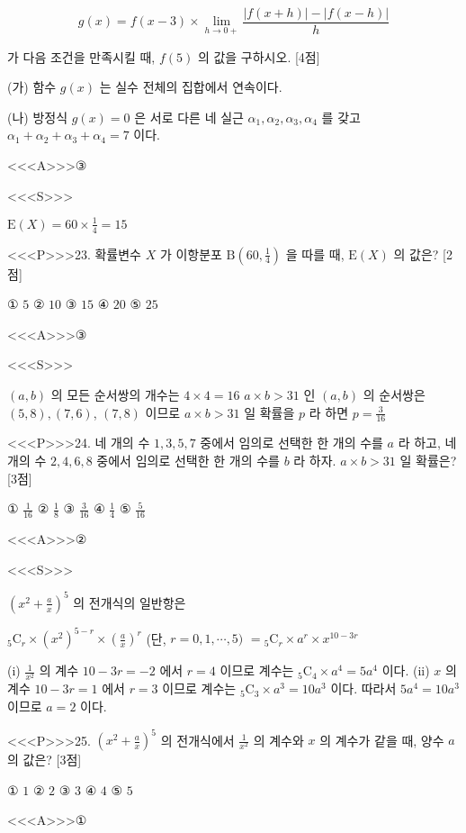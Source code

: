 \documentclass{oblivoir}
\begin{document}
$$g(x)=f(x-3) \times \lim _{h \rightarrow 0+} \frac{|f(x+h)|-|f(x-h)|}{h}$$

가 다음 조건을 만족시킬 때, $f(5)$ 의 값을 구하시오. [4점]

(가) 함수 $g(x)$ 는 실수 전체의 집합에서 연속이다.

(나) 방정식 $g(x)=0$ 은 서로 다른 네 실근 $\alpha_{1}, \alpha_{2}, \alpha_{3}, \alpha_{4}$ 를 갖고 $\alpha_{1}+\alpha_{2}+\alpha_{3}+\alpha_{4}=7$ 이다.

<<<A>>>③

<<<S>>>

$\mathrm{E}(X)=60 \times \frac{1}{4}=15$


<<<P>>>23. 확률변수 $X$ 가 이항분포 $\mathrm{B}\left(60, \frac{1}{4}\right)$ 을 따를 때, $\mathrm{E}(X)$ 의 값은? [2점]

① $5$
② $10$
③ $15$
④ $20$
⑤ $25$

<<<A>>>③

<<<S>>>


$(a, b)$ 의 모든 순서쌍의 개수는 $4 \times 4=16$
$a \times b>31$ 인 $(a, b)$ 의 순서쌍은 $(5,8),(7,6)$,
$(7,8)$ 이므로
$a \times b>31$ 일 확률을 $p$ 라 하면
$p=\frac{3}{16}$


<<<P>>>24. 네 개의 수 $1,3,5,7$ 중에서 임의로 선택한 한 개의 수를 $a$ 라 하고, 네 개의 수 $2,4,6,8$ 중에서 임의로 선택한 한 개의 수를 $b$ 라 하자. $a \times b>31$ 일 확률은? [3점]

① $\frac{1}{16}$
② $\frac{1}{8}$
③ $\frac{3}{16}$
④ $\frac{1}{4}$
⑤ $\frac{5}{16}$

<<<A>>>②

<<<S>>>



$\left(x^{2}+\frac{a}{x}\right)^{5}$ 의 전개식의 일반항은


${ }_{5} \mathrm{C}_{r} \times\left(x^{2}\right)^{5-r} \times\left(\frac{a}{x}\right)^{r}$ (단, $r=0,1, \cdots, 5)$
$={ }_{5} \mathrm{C}_{r} \times a^{r} \times x^{10-3 r}$


(i) $\frac{1}{x^{2}}$ 의 계수
$10-3 r=-2$ 에서 $r=4$ 이므로
계수는 ${ }_{5} \mathrm{C}_{4} \times a^{4}=5 a^{4}$ 이다.
(ii) $x$ 의 계수
$10-3 r=1$ 에서 $r=3$ 이므로
계수는 ${ }_{5} \mathrm{C}_{3} \times a^{3}=10 a^{3}$ 이다.
따라서 $5 a^{4}=10 a^{3}$ 이므로 $a=2$ 이다.


<<<P>>>25. $\left(x^{2}+\frac{a}{x}\right)^{5}$ 의 전개식에서 $\frac{1}{x^{2}}$ 의 계수와 $x$ 의 계수가 같을 때, 양수 $a$ 의 값은? [3점]

① $1$
② $2$
③ $3$
④ $4$
⑤ $5$

<<<A>>>①
\end{document}

